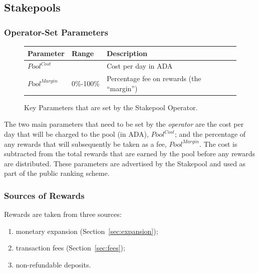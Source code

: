 \documentclass[11pt,a4paper,dvipsnames,twosided,final]{article}
\newcommand{\ada}{ADA{}}
\begin{document}
\clearpage
\subsection{Stakepools}

\subsubsection*{Operator-Set Parameters}

\begin{figure}[h!]
\begin{center}
\begin{tabular}{||l|l|p{9cm}||}
  \hline \hline
\textbf{Parameter} & \textbf{Range} & \textbf{Description} \\\hline
{\color{red} $\textit{Pool}^{\textit{Cost}}$} &  & {\color{red} Cost per day in \ada{}} \\\hline
{\color{red} ${\textit{Pool}}^{\textit{Margin}}$} &  {\color{red} 0\%-100\%} & {\color{red} Percentage fee on rewards (the ``margin'')} \\\hline
  \hline
\end{tabular}
\end{center}
\caption{Key Parameters that are set by the Stakepool Operator.}
\end{figure}

\noindent
The two main parameters that need to be set by the \emph{operator} are the cost per day that will be charged to
the pool (in \ada), $\textit{Pool}^{\textit{Cost}}$; and the percentage of any rewards that will subsequently be taken as a fee, ${\textit{Pool}}^{\textit{Margin}}$.
The cost is subtracted from the total rewards that are earned by the pool before any rewards are distributed.
These parameters are advertised by the Stakepool and used as part of the public ranking scheme.

\subsubsection*{Sources of Rewards}

Rewards are taken from three sources:

\begin{enumerate}
\item
  monetary expansion (Section~\ref{sec:expansion});
\item
  transaction fees (Section~\ref{sec:fees});
\item
  non-refundable deposits.
\end{enumerate}
\end{document}
